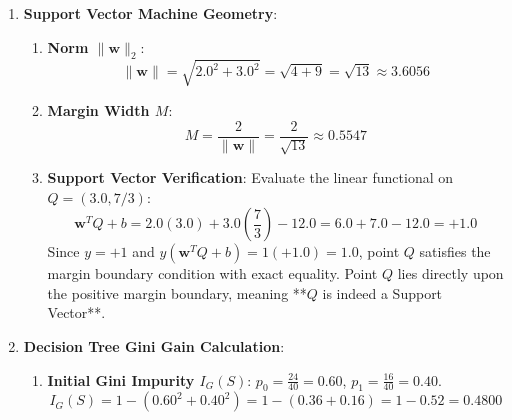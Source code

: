 \begin{enumerate}
\begin{enumerate}[label=(\alph*)]
        \item \textbf{Normalized Posterior and Prediction}:
        Total marginal probability $P(x) = 0.003506 + 0.009679 = 0.013185$.
        \begin{equation*}
        P(y=1 \mid x=35) = \frac{0.009679}{0.013185} \approx \mathbf{0.7341} \quad (73.41\%)
        \end{equation*}
        Because $P(y=1 \mid x=35) = 73.41\% > 50\%$, the system predicts **Class 1 (Active Wildfire)**.
    \end{enumerate}

    \item \textbf{Support Vector Machine Geometry}:
    \begin{enumerate}[label=(\alph*)]
        \item \textbf{Norm $\|\mathbf{w}\|_2$}:
        \begin{equation*}
        \|\mathbf{w}\| = \sqrt{2.0^2 + 3.0^2} = \sqrt{4 + 9} = \sqrt{13} \approx \mathbf{3.6056}
        \end{equation*}

        \item \textbf{Margin Width $M$}:
        \begin{equation*}
        M = \frac{2}{\|\mathbf{w}\|} = \frac{2}{\sqrt{13}} \approx \mathbf{0.5547}
        \end{equation*}

        \item \textbf{Support Vector Verification}:
        Evaluate the linear functional on $Q = (3.0, 7/3)$:
        \begin{equation*}
        \mathbf{w}^T Q + b = 2.0(3.0) + 3.0\left(\frac{7}{3}\right) - 12.0 = 6.0 + 7.0 - 12.0 = \mathbf{+1.0}
        \end{equation*}
        Since $y = +1$ and $y(\mathbf{w}^T Q + b) = 1(+1.0) = 1.0$, point $Q$ satisfies the margin boundary condition with exact equality. Point $Q$ lies directly upon the positive margin boundary, meaning **$Q$ is indeed a Support Vector**.
    \end{enumerate}

    \item \textbf{Decision Tree Gini Gain Calculation}:
    \begin{enumerate}[label=(\alph*)]
        \item \textbf{Initial Gini Impurity $I_G(S)$}:
        $p_0 = \frac{24}{40} = 0.60$, $p_1 = \frac{16}{40} = 0.40$.
        \begin{equation*}
        I_G(S) = 1 - \left( 0.60^2 + 0.40^2 \right) = 1 - (0.36 + 0.16) = 1 - 0.52 = \mathbf{0.4800}
        \end{equation*}


\end{enumerate}
\end{enumerate}
